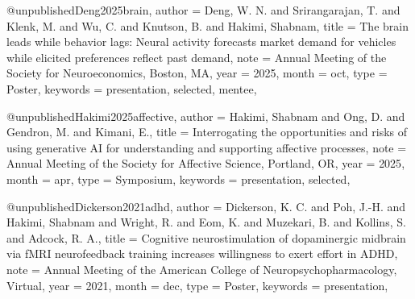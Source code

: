 %
%
%


@unpublished{Deng2025brain,
  author   = {Deng, W. N. and Srirangarajan, T. and Klenk, M.
              and Wu, C. and Knutson, B. and Hakimi, Shabnam},
  title    = {The brain leads while behavior lags: Neural activity forecasts
              market demand for vehicles while elicited preferences reflect
              past demand},
  note     = {Annual Meeting of the Society for Neuroeconomics, Boston, MA},
  year     = {2025},
  month    = oct,
  type     = {Poster},
  keywords = {presentation, selected, mentee},
}

@unpublished{Hakimi2025affective,
  author   = {Hakimi, Shabnam and Ong, D. and Gendron, M. and Kimani, E.},
  title    = {Interrogating the opportunities and risks of using generative
              {AI} for understanding and supporting affective processes},
  note     = {Annual Meeting of the Society for Affective Science, Portland, OR},
  year     = {2025},
  month    = apr,
  type     = {Symposium},
  keywords = {presentation, selected},
}


@unpublished{Dickerson2021adhd,
  author   = {Dickerson, K. C. and Poh, J.-H. and Hakimi, Shabnam
              and Wright, R. and Eom, K. and Muzekari, B.
              and Kollins, S. and Adcock, R. A.},
  title    = {Cognitive neurostimulation of dopaminergic midbrain via {fMRI}
              neurofeedback training increases willingness to exert effort
              in {ADHD}},
  note     = {Annual Meeting of the American College of
              Neuropsychopharmacology, Virtual},
  year     = {2021},
  month    = dec,
  type     = {Poster},
  keywords = {presentation},
}


